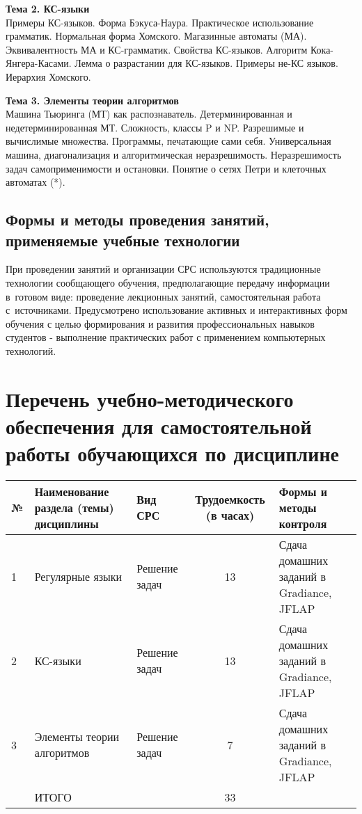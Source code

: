 \documentclass[a4paper,12pt]{article}
\begin{document}
\textbf{Тема 2. КС-языки        }\\
Примеры КС-языков. Форма Бэкуса-Наура. Практическое использование грамматик. Нормальная форма Хомского. Магазинные автоматы (МА). Эквивалентность МА и КС-грамматик. Свойства КС-языков. Алгоритм Кока-Янгера-Касами. Лемма о разрастании для КС-языков. Примеры не-КС языков. Иерархия Хомского.

\textbf{Тема 3. Элементы теории алгоритмов	   }\\
Машина Тьюринга (МТ) как распознаватель. Детерминированная и недетерминированная МТ. Сложность, классы P и NP. Разрешимые и вычислимые множества. Программы, печатающие сами себя. Универсальная машина, диагонализация и алгоритмическая неразрешимость. Неразрешимость задач самоприменимости и остановки. Понятие о сетях Петри и клеточных автоматах (*).
 

\subsection{Формы и методы проведения занятий, применяемые учебные технологии}
При проведении занятий и организации СРС используются традиционные технологии сообщающего обучения, предполагающие передачу информации в~готовом виде: проведение лекционных занятий, самостоятельная работа с~источниками. Предусмотрено использование активных и интерактивных форм обучения с целью формирования и развития профессиональных навыков студентов - выполнение практических работ с применением компьютерных технологий. 



\section{Перечень учебно-методического обеспечения для самостоятельной работы обучающихся по дисциплине}
\begin{longtable}{|l|>{\raggedright\arraybackslash}p{40mm}|>{\raggedright\arraybackslash}p{34mm}|c|>{\raggedright\arraybackslash}p{50mm}|}
\hline
№ & \centering Наименование раздела (темы) дисциплины & 
\centering Вид СРС & \multicolumn{1}{p{14mm}|}{\centering Трудо\-емкость (в часах)} & \centering\arraybackslash Формы и методы контроля\\
\hline
1 & Регулярные языки	           & Решение задач  & 13 & Сдача домашних заданий в Gradiance, JFLAP \\ 
\hline
2 & КС-языки					   & Решение задач  & 13 & Сдача домашних заданий в Gradiance, JFLAP \\ 
\hline
3 & Элементы теории алгоритмов  & Решение задач  &  7 & Сдача домашних заданий в Gradiance, JFLAP \\ 
\hline
 & ИТОГО                       &                & 33 &  \\ 

\hline
\end{longtable}
\end{document}
